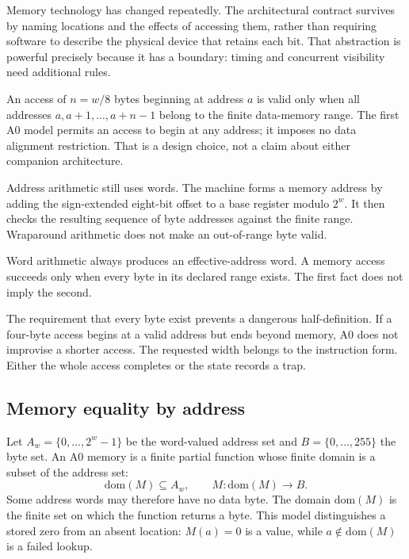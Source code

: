 \begin{archive}[title={The durable abstraction is a numbered place}]
Memory technology has changed repeatedly. The architectural contract survives
by naming locations and the effects of accessing them, rather than requiring
software to describe the physical device that retains each bit. That
abstraction is powerful precisely because it has a boundary: timing and
concurrent visibility need additional rules.
\end{archive}

An access of \(n=w/8\) bytes beginning at address \(a\) is valid only when all
addresses \(a,a+1,\ldots,a+n-1\) belong to the finite data-memory range. The
first A0 model permits an access to begin at any address; it imposes no data
alignment restriction. That is a design choice, not a claim about either
companion architecture.

Address arithmetic still uses words. The machine forms a memory address by
adding the sign-extended eight-bit offset to a base register modulo \(2^w\).
It then checks the resulting sequence of byte addresses against the finite
range. Wraparound arithmetic does not make an out-of-range byte valid.

\begin{keyidea}[title={Address formation and access validity are different rules}]
Word arithmetic always produces an effective-address word. A memory access
succeeds only when every byte in its declared range exists. The first fact
does not imply the second.
\end{keyidea}

The requirement that every byte exist prevents a dangerous half-definition.
If a four-byte access begins at a valid address but ends beyond memory, A0
does not improvise a shorter access. The requested width belongs to the
instruction form. Either the whole access completes or the state records a
trap.

\subsection{Memory equality by address}

Let \(A_w=\{0,\ldots,2^w-1\}\) be the word-valued address set and
\(B=\{0,\ldots,255\}\) the byte set. An A0 memory is a finite partial
function whose finite domain is a subset of the address set:
\[
 \mathrm{dom}(M)\subseteq A_w,\qquad
 M:\mathrm{dom}(M)\longrightarrow B.
\]
Some address words may therefore have no data byte. The domain
\(\mathrm{dom}(M)\) is the finite set on which the function returns a byte.
This model distinguishes a stored zero from an absent location:
\(M(a)=0\) is a value, while \(a\notin\mathrm{dom}(M)\) is a failed lookup.


